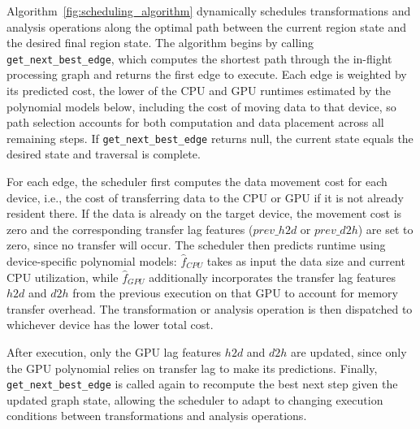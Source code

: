 Algorithm~\ref{fig:scheduling_algorithm} dynamically schedules transformations and analysis operations along the optimal path between the current region state and the desired final region state. The algorithm begins by calling \texttt{get\_next\_best\_edge}, which computes the shortest path through the in-flight processing graph and returns the first edge to execute. Each edge is weighted by its predicted cost, the lower of the CPU and GPU runtimes estimated by the polynomial models below, including the cost of moving data to that device, so path selection accounts for both computation and data placement across all remaining steps. If \texttt{get\_next\_best\_edge} returns null, the current state equals the desired state and traversal is complete.

For each edge, the scheduler first computes the data movement cost for each device, i.e., the cost of transferring data to the CPU or GPU if it is not already resident there. If the data is already on the target device, the movement cost is zero and the corresponding transfer lag features ($prev\_h2d$ or $prev\_d2h$) are set to zero, since no transfer will occur. The scheduler then predicts runtime using device-specific polynomial models: $\hat{f}_{CPU}$ takes as input the data size and current CPU utilization, while $\hat{f}_{GPU}$ additionally incorporates the transfer lag features $h2d$ and $d2h$ from the previous execution on that GPU to account for memory transfer overhead. The transformation or analysis operation is then dispatched to whichever device has the lower total cost.

After execution, only the GPU lag features $h2d$ and $d2h$ are updated, since only the GPU polynomial relies on transfer lag to make its predictions. Finally, \texttt{get\_next\_best\_edge} is called again to recompute the best next step given the updated graph state, allowing the scheduler to adapt to changing execution conditions between transformations and analysis operations.